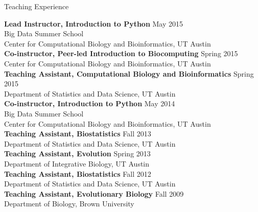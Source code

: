 \documentclass{resume} %
\begin{document}
\vspace*{0.5cm}
\begin{rSection}{Teaching Experience}
\vspace*{0.25cm}

\textbf{Lead Instructor, Introduction to Python} \hfill May 2015 \\ Big Data Summer School \\ Center for Computational Biology and Bioinformatics, UT Austin \\ 

\textbf{Co-instructor, Peer-led Introduction to Biocomputing} \hfill Spring 2015 \\ Center for Computational Biology and Bioinformatics, UT Austin \\ 

\textbf{Teaching Assistant, Computational Biology and Bioinformatics} \hfill Spring 2015 \\ Department of Statistics and Data Science, UT Austin \\ 

\textbf{Co-instructor, Introduction to Python} \hfill May 2014 \\ Big Data Summer School \\ Center for Computational Biology and Bioinformatics, UT Austin \\ 

\textbf{Teaching Assistant, Biostatistics} \hfill Fall 2013 \\ Department of Statistics and Data Science, UT Austin \\ 

\textbf{Teaching Assistant, Evolution} \hfill Spring 2013 \\ Department of Integrative Biology, UT Austin \\ 

\textbf{Teaching Assistant, Biostatistics} \hfill Fall 2012  \\ Department of Statistics and Data Science, UT Austin \\ 

\textbf{Teaching Assistant, Evolutionary Biology} \hfill Fall 2009  \\ Department of Biology, Brown University


\end{rSection}
\vspace*{0.5cm}
\end{document}
